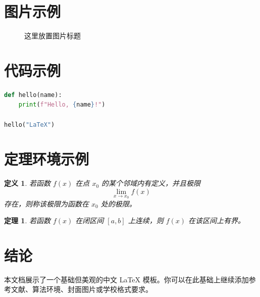 \documentclass[12pt,a4paper]{ctexart}
\newtheorem{theorem}{定理}
\newtheorem{definition}{定义}
\begin{document}
\section{图片示例}

\begin{figure}[htbp]
\centering
\caption{这里放置图片标题}
\end{figure}

\section{代码示例}

\begin{lstlisting}[language=Python, caption={Python 示例代码}]
def hello(name):
    print(f"Hello, {name}!")

hello("LaTeX")
\end{lstlisting}

\section{定理环境示例}

\begin{definition}
若函数 $f(x)$ 在点 $x_0$ 的某个邻域内有定义，并且极限
\[
    \lim_{x \to x_0} f(x)
\]
存在，则称该极限为函数在 $x_0$ 处的极限。
\end{definition}

\begin{theorem}
若函数 $f(x)$ 在闭区间 $[a,b]$ 上连续，则 $f(x)$ 在该区间上有界。
\end{theorem}

\section{结论}

本文档展示了一个基础但美观的中文 \LaTeX{} 模板。你可以在此基础上继续添加参考文献、算法环境、封面图片或学校格式要求。
\end{document}

